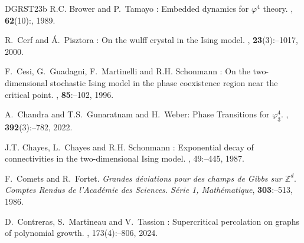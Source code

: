 \documentclass[11pt,a4paper]{article}
\theoremstyle{definition}
\numberwithin{equation}{section}
\begin{document}
\begin{thebibliography}{DGRST23b}
R.C. \bgroup\fonteauteurs\bgroup Brower\egroup\egroup{} and P.~\bgroup\fonteauteurs\bgroup Tamayo\egroup\egroup{} :
\newblock Embedded dynamics for $\varphi^4$ theory.
, \textbf{62}(10)\string:, 1989.

R.~\bgroup\fonteauteurs\bgroup Cerf\egroup\egroup{} and {\'A}.~\bgroup\fonteauteurs\bgroup Pisztora\egroup\egroup{} :
\newblock On the wulff crystal in the {I}sing model.
, \textbf{23}(3)\string:--1017, 2000.



F.~\bgroup\fonteauteurs\bgroup Cesi\egroup\egroup{}, G.~\bgroup\fonteauteurs\bgroup Guadagni\egroup\egroup{}, F.~\bgroup\fonteauteurs\bgroup Martinelli\egroup\egroup{} and R.H. \bgroup\fonteauteurs\bgroup Schonmann\egroup\egroup{} :
\newblock On the two-dimensional stochastic {I}sing model in the phase coexistence region near the critical point.
, \textbf{85}\string:--102, 1996.

A.~\bgroup\fonteauteurs\bgroup Chandra\egroup\egroup{} and T.S.~\bgroup\fonteauteurs\bgroup Gunaratnam\egroup\egroup{} and H.~\bgroup\fonteauteurs\bgroup Weber\egroup\egroup{}:
\newblock Phase Transitions for $\varphi^4_3$.
, \textbf{392}(3)\string:--782, 2022.

J.T. \bgroup\fonteauteurs\bgroup Chayes\egroup\egroup{}, L.~\bgroup\fonteauteurs\bgroup Chayes\egroup\egroup{} and R.H. \bgroup\fonteauteurs\bgroup Schonmann\egroup\egroup{} :
\newblock Exponential decay of connectivities in the two-dimensional {I}sing model.
, 49\string:--445, 1987.

\bgroup\fonteauteurs\bgroup F.~Comets and R.~Fortet\egroup\egroup. 
\emph{Grandes d\'eviations pour des champs de Gibbs sur $\mathbb{Z}^d$}. 
\emph{Comptes Rendus de l'Académie des Sciences. Série 1, Mathématique}, \textbf{303}:--513, 1986.

D.~\bgroup\fonteauteurs\bgroup Contreras\egroup\egroup{}, S.~\bgroup\fonteauteurs\bgroup Martineau\egroup\egroup{} and V.~\bgroup\fonteauteurs\bgroup Tassion\egroup\egroup{} :
\newblock Supercritical percolation on graphs of polynomial growth.
, 173(4)\string:--806, 2024.


\end{thebibliography}
\end{document}
